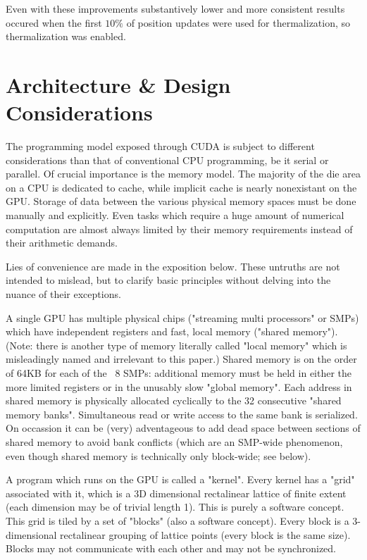 \documentclass[11pt, conference, compsocconf]{IEEEtran}
\begin{document}
Even with these improvements substantively lower and more consistent results occured when the first $10\%$ of position updates were used for thermalization, so thermalization was enabled.

\section{Architecture \& Design Considerations}
The programming model exposed through CUDA is subject to different considerations than that of conventional CPU programming, be it serial or parallel. Of crucial importance is the memory model. The majority of the die area on a CPU is dedicated to cache, while implicit cache is nearly nonexistant on the GPU. Storage of data between the various physical memory spaces must be done manually and explicitly. Even tasks which require a huge amount of numerical computation are almost always limited by their memory requirements instead of their arithmetic demands.

Lies of convenience are made in the exposition below. These untruths are not intended to mislead, but to clarify basic principles without delving into the nuance of their exceptions.

A single GPU has multiple physical chips ("streaming multi processors" or SMPs) which have independent registers and fast, local memory ("shared memory"). (Note: there is another type of memory literally called "local memory" which is misleadingly named and irrelevant to this paper.) Shared memory is on the order of 64KB for each of the ~8 SMPs: additional memory must be held in either the more limited registers or in the unusably slow "global memory". Each address in shared memory is physically allocated cyclically to the 32 consecutive "shared memory banks". Simultaneous read or write access to the same bank is serialized. On occassion it can be (very) adventageous to add dead space between sections of shared memory to avoid bank conflicts (which are an SMP-wide phenomenon, even though shared memory is technically only block-wide; see below).

A program which runs on the GPU is called a "kernel". Every kernel has a "grid" associated with it, which is a 3D dimensional rectalinear lattice of finite extent (each dimension may be of trivial length 1). This is purely a software concept. This grid is tiled by a set of "blocks" (also a software concept). Every block is a 3-dimensional rectalinear grouping of lattice points (every block is the same size). Blocks may not communicate with each other and may not be synchronized. 
\end{document}
